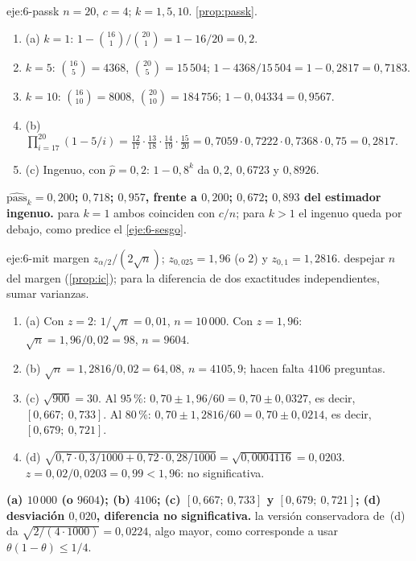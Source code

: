 \begin{solucion}{eje:6-passk}
\datos $n=20$, $c=4$; $k=1,5,10$.
\planteamiento \cref{prop:passk}.
\pasos
\begin{enumerate}[label=\arabic*.]
  \item (a) $k=1$: $1-\binom{16}{1}/\binom{20}{1}=1-16/20=0{,}2$.
  \item $k=5$: $\binom{16}{5}=4368$, $\binom{20}{5}=15\,504$; $1-4368/15\,504=1-0{,}2817=0{,}7183$.
  \item $k=10$: $\binom{16}{10}=8008$, $\binom{20}{10}=184\,756$; $1-0{,}04334=0{,}9567$.
  \item (b) $\prod_{i=17}^{20}(1-5/i)=\tfrac{12}{17}\cdot\tfrac{13}{18}\cdot\tfrac{14}{19}\cdot\tfrac{15}{20}=0{,}7059\cdot 0{,}7222\cdot 0{,}7368\cdot 0{,}75=0{,}2817$.
  \item (c) Ingenuo, con $\hat p=0{,}2$: $1-0{,}8^{k}$ da $0{,}2$, $0{,}6723$ y $0{,}8926$.
\end{enumerate}
\resultado \textbf{$\widehat{\mathrm{pass}}_k=0{,}200$; $0{,}718$; $0{,}957$, frente a $0{,}200$; $0{,}672$; $0{,}893$ del estimador ingenuo.}
\comprobacion para $k=1$ ambos coinciden con $c/n$; para $k>1$ el ingenuo queda por debajo, como predice el \cref{eje:6-sesgo}.
\end{solucion}

\begin{solucion}{eje:6-mit}
\datos margen $z_{\alpha/2}/(2\sqrt n)$; $z_{0{,}025}=1{,}96$ (o $2$) y $z_{0{,}1}=1{,}2816$.
\planteamiento despejar $n$ del margen (\cref{prop:ic}); para la diferencia de dos exactitudes independientes, sumar varianzas.
\pasos
\begin{enumerate}[label=\arabic*.]
  \item (a) Con $z=2$: $1/\sqrt n=0{,}01$, $n=10\,000$. Con $z=1{,}96$: $\sqrt n=1{,}96/0{,}02=98$, $n=9604$.
  \item (b) $\sqrt n=1{,}2816/0{,}02=64{,}08$, $n=4105{,}9$; hacen falta $4106$ preguntas.
  \item (c) $\sqrt{900}=30$. Al $95\,\%$: $0{,}70\pm 1{,}96/60=0{,}70\pm 0{,}0327$, es decir, $[0{,}667;\allowbreak\ 0{,}733]$. Al $80\,\%$: $0{,}70\pm 1{,}2816/60=0{,}70\pm 0{,}0214$, es decir, $[0{,}679;\allowbreak\ 0{,}721]$.
  \item (d) $\sqrt{0{,}7\cdot 0{,}3/1000+0{,}72\cdot 0{,}28/1000}=\sqrt{0{,}0004116}=0{,}0203$. $z=0{,}02/0{,}0203=0{,}99<1{,}96$: no significativa.
\end{enumerate}
\resultado \textbf{(a) $10\,000$ (o $9604$); (b) $4106$; (c) $[0{,}667;\allowbreak\ 0{,}733]$ y $[0{,}679;\allowbreak\ 0{,}721]$; (d) desviación $0{,}020$, diferencia no significativa.}
\comprobacion la versión conservadora de~(d) da $\sqrt{2/(4\cdot 1000)}=0{,}0224$, algo mayor, como corresponde a usar $\theta(1-\theta)\le 1/4$.
\end{solucion}

